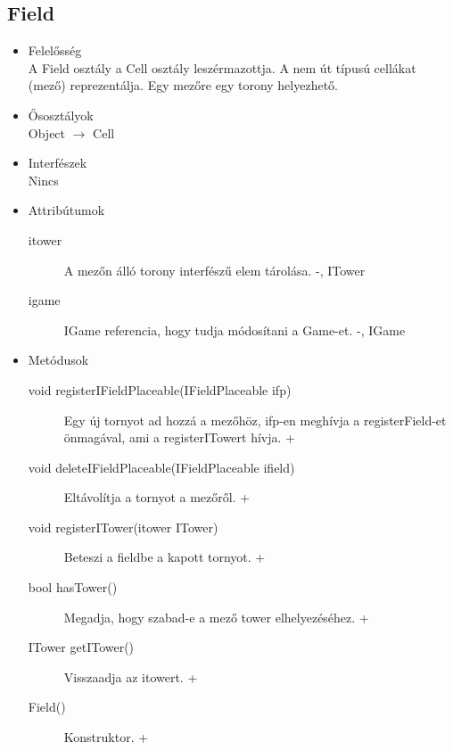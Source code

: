 \subsection{Field}
\begin{itemize}
\item Felelősség\\
A Field osztály a Cell osztály leszérmazottja. A nem út típusú cellákat (mező) reprezentálja. Egy mezőre egy torony helyezhető.
\item Ősosztályok\\
Object $\rightarrow$ Cell
\item Interfészek\\
Nincs
\item Attribútumok\\
	\begin{description}
		\item[itower] A mezőn álló torony interfészű elem tárolása. -, ITower 
		\item[igame] IGame referencia, hogy tudja módosítani a Game-et. -, IGame

		
	\end{description}
\item Metódusok\\
	\begin{description}
		
		
		\item[void registerIFieldPlaceable(IFieldPlaceable ifp)] Egy új tornyot ad hozzá a mezőhöz, ifp-en meghívja a registerField-et önmagával, ami a registerITowert hívja. +
		\item[void deleteIFieldPlaceable(IFieldPlaceable ifield)] Eltávolítja a tornyot a mezőről. +
		\item[void registerITower(itower ITower)] Beteszi a fieldbe a kapott tornyot. +
		\item[bool hasTower()] Megadja, hogy szabad-e a mező tower elhelyezéséhez. +
		\item[ITower getITower()] Visszaadja az itowert. +
		\item[Field()] Konstruktor. +
		
		
	\end{description}
\end{itemize}



